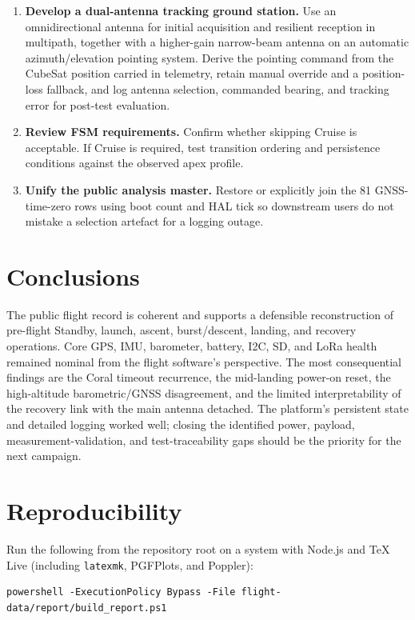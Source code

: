 \documentclass[11pt,a4paper]{article}
\begin{document}
\begin{enumerate}
  \item \textbf{Develop a dual-antenna tracking ground station.} Use an omnidirectional antenna for initial acquisition and resilient reception in multipath, together with a higher-gain narrow-beam antenna on an automatic azimuth/elevation pointing system. Derive the pointing command from the CubeSat position carried in telemetry, retain manual override and a position-loss fallback, and log antenna selection, commanded bearing, and tracking error for post-test evaluation.
  \item \textbf{Review FSM requirements.} Confirm whether skipping Cruise is acceptable. If Cruise is required, test transition ordering and persistence conditions against the observed apex profile.
  \item \textbf{Unify the public analysis master.} Restore or explicitly join the 81 GNSS-time-zero rows using boot count and HAL tick so downstream users do not mistake a selection artefact for a logging outage.
\end{enumerate}

\section{Conclusions}

The public flight record is coherent and supports a defensible reconstruction
of pre-flight Standby, launch, ascent, burst/descent, landing, and recovery
operations. Core GPS, IMU, barometer, battery, I2C, SD, and LoRa health remained
nominal from the flight software's perspective. The most consequential findings
are the Coral timeout recurrence, the mid-landing power-on reset, the
high-altitude barometric/GNSS disagreement, and the limited interpretability of
the recovery link with the main antenna detached. The platform's persistent
state and detailed logging worked well; closing the identified power, payload,
measurement-validation, and test-traceability gaps should be the priority for
the next campaign.

\appendix
\section{Reproducibility}

Run the following from the repository root on a system with Node.js and TeX
Live (including \texttt{latexmk}, PGFPlots, and Poppler):

\begin{verbatim}
powershell -ExecutionPolicy Bypass -File flight-data/report/build_report.ps1
\end{verbatim}
\end{document}

